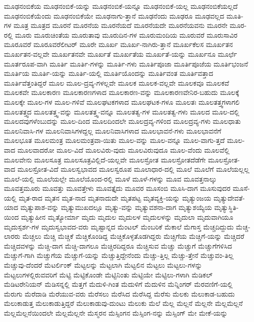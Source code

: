 {ಮೂಢನಂಬಿಕೆಯ
ಮೂಢನಂಬಿಕೆ-ಯನ್ನು
ಮೂಢನಂಬಿಕೆ-ಯನ್ನೂ
ಮೂಢನಂಬಿಕೆ-ಯಲ್ಲ
ಮೂಢನಂಬಿಕೆಯಲ್ಲದೆ
ಮೂಢನಂಬಿಕೆಯೆಂದು
ಮೂಢನಂಬಿಕೆಯೇ
ಮೂಢನಾಗು-ತ್ತಾನೆ
ಮೂಢನೆಂದು
ಮೂಢರೂ
ಮೂಢವಲ್ಲದ
ಮೂತಿ-ಗಳ
ಮೂತ್ರ
ಮೂತ್ರದ
ಮೂರನೆ
ಮೂರನೆಯ
ಮೂರನೆಯದೆ
ಮೂರನೆಯದೇ
ಮೂರನೆಯವನು
ಮೂರನೇ
ಮೂರ-ರಲ್ಲಿ
ಮೂರು
ಮೂರುಚಿಂತೆಯ
ಮೂರುತಾವು
ಮೂರುದಿನ-ಗಳ
ಮೂರುಮಂದಿಯ
ಮೂರುವರೆ
ಮೂರುಸಾವಿರ
ಮೂರೂವರೆ
ಮೂರೂವರೆಲೀಟರ್
ಮೂರೇ
ಮೂರ್ಖ
ಮೂರ್ಖ-ನಾಗಿರು-ತ್ತಾನೆ
ಮೂರ್ಖಕೆಲಸ
ಮೂರ್ಖತನ
ಮೂರ್ಖತನ-ವಲ್ಲವೇ
ಮೂರ್ಖತನವೇ
ಮೂರ್ಖತೆ
ಮೂರ್ಖತೆಯ
ಮೂರ್ಖತೆ-ಯನ್ನು
ಮೂರ್ಖನೂ
ಮೂರ್ಛೆ
ಮೂರ್ತರೂಪ-ವಾಗಿ
ಮೂರ್ತಿ
ಮೂರ್ತಿ-ಗಳನ್ನು
ಮೂರ್ತಿ-ಗಳು
ಮೂರ್ತಿಪೂಜಾ
ಮೂರ್ತಿಪೂಜೆಯ
ಮೂರ್ತಿಭಂಜನೆ
ಮೂರ್ತಿಯ
ಮೂರ್ತಿ-ಯನ್ನು
ಮೂರ್ತಿ-ಯಲ್ಲಿ
ಮೂರ್ತಿಯೊಂದನ್ನು
ಮೂರ್ತಿವಂತ
ಮೂರ್ತಿವತ್ತಾದ
ಮೂರ್ತಿವೆತ್ತಂತಿದ್ದರೆ
ಮೂಲ
ಮೂಲ-ದ್ರವ್ಯ-ಗಳಲ್ಲವೇ
ಮೂಲಕ
ಮೂಲಕ-ವಲ್ಲವೇ
ಮೂಲಕವೂ
ಮೂಲಕವೆ
ಮೂಲಕವೇ
ಮೂಲಕಾರಣ
ಮೂಲಕಾರಣಗಳಾದ
ಮೂಲಕಾರಣ-ವನ್ನು
ಮೂಲಕಾರಣವೇನಿರ-ಬಹುದು
ಮೂಲಕ್ಕೆ
ಮೂಲಕ್ಕೇ
ಮೂಲ-ಗಳ
ಮೂಲ-ಗಳಿವೆ
ಮೂಲಘಟಕಗಳಾದ
ಮೂಲಘಟಕ-ಗಳೂ
ಮೂಲತಃ
ಮೂಲತತ್ತ್ವಗಳಾಗಲಿ
ಮೂಲತತ್ತ್ವದ
ಮೂಲತತ್ತ್ವ-ವನ್ನು
ಮೂಲತತ್ತ್ವ-ವನ್ನೂ
ಮೂಲತತ್ವ-ಗಳ
ಮೂಲತತ್ವ-ಗಳು
ಮೂಲದ
ಮೂಲ-ದಲ್ಲಿ
ಮೂಲದವುಗಳೆಂಬುದನ್ನು
ಮೂಲ-ದಿಂದ
ಮೂಲದಿಂದಲೇ
ಮೂಲದ್ರವ್ಯ-ಗಳಿಂದ
ಮೂಲದ್ರವ್ಯ-ಗಳು
ಮೂಲಧಾತು
ಮೂಲನಿವಾಸಿ-ಗಳ
ಮೂಲನಿವಾಸಿಗಳದ್ದಲ್ಲ
ಮೂಲನಿವಾಸಿಗಳಾದ
ಮೂಲಭಾವನೆ-ಗಳು
ಮೂಲಭಾವನೆಗೆ
ಮೂಲಭೂತ
ಮೂಲಮಂತ್ರ
ಮೂಲಮಂತ್ರವಾ-ಯಿತು
ಮೂಲ-ವನ್ನು
ಮೂಲ-ವನ್ನೂ
ಮೂಲ-ವಾಗು-ತ್ತದೆ
ಮೂಲ-ವಾದ
ಮೂಲವಾದರೋ
ಮೂಲ-ವಿದೆ
ಮೂಲವಿರು-ವುದು
ಮೂಲವಿರುವುದೂ
ಮೂಲ-ವೆಂದು
ಮೂಲವೆಲ್ಲಿ
ಮೂಲವೇನು
ಮೂಲಸೂತ್ರ
ಮೂಲಸೂತ್ರವಿಲ್ಲಿದೆ-ಯಲ್ಲವೇ
ಮೂಲಸ್ರೋತ
ಮೂಲಸ್ರೋತದೆಡೆಗೇ
ಮೂಲಸ್ರೋತ-ವಾದ
ಮೂಲಸ್ರೋತ-ವಿದೆ
ಮೂಲಸ್ವಭಾವದ
ಮೂಲಸ್ವರೂಪ
ಮೂಲಾಧಾರ-ದಲ್ಲಿ
ಮೂಲೆ
ಮೂಲೆಗೆ
ಮೂಲೆಯಲ್ಲಲ್ಲ
ಮೂಲೆ-ಯಲ್ಲಿ
ಮೂಲೆಯಲ್ಲೇ
ಮೂಲೆಯೊಂದ-ರಲ್ಲಿ
ಮೂಳೆ
ಮೂಳೆ-ಗಳನ್ನು
ಮೂವ
ಮೂವತ್ತನಾಲ್ಕು
ಮೂವತ್ತಮೂರು
ಮೂವತ್ತು
ಮೂವತ್ತೇಳು
ಮೂವತ್ತೈದು
ಮೂವರ
ಮೂಸಂಬಿ
ಮೂಸಿ-ದಾಗ
ಮೂಸುವುದರ
ಮೂಸೆ-ಯಲ್ಲಿ
ಮೃತ-ರಾದ
ಮೃತನ
ಮೃತ-ನಾದ
ಮೃತನಾದುದೇ
ಮೃತಪಟ್ಟ
ಮೃತವ್ಯಕ್ತಿ-ಯನ್ನು
ಮೃತ್ಯುಂಜಯ
ಮೃತ್ಯುದೇವತೆ-ಯಾದ
ಮೃತ್ಯುಪಾಶ-ವನ್ನು
ಮೃತ್ಯುಮುಖದಲ್ಲೂ
ಮೃತ್ಯು-ವನ್ನು
ಮೃತ್ಯುವಶನಾ-ದಾಗ
ಮೃತ್ಯುಶಯ್ಯೆಯ
ಮೃತ್ಯುಸ್ಥಿತಿ-ಯಿಂದ
ಮೃತ್ಯುಹೀನ
ಮೃತ್ಯೋರ್ಮಾ
ಮೃದು
ಮೃದುಲ
ಮೃದುಲಳ
ಮೃದುಲಳನ್ನು
ಮೃದುಲಾ
ಮೃದುವಾಗಿಯೂ
ಮೃದುಸ್ಪರ್ಶ-ಗಳ
ಮೃದುಸ್ವಭಾವದ-ವರು
ಮೃಷ್ಟಾನ್ನದ
ಮೆಂಟಲ್
ಮೆಂಬರಿಕೆ
ಮೆಕಾಲೆ
ಮೆಗಾಸ್ತ
ಮೆಚ್ಚದಿದ್ದುದು
ಮೆಚ್ಚ-ಲಾರರು
ಮೆಚ್ಚಲು
ಮೆಚ್ಚಿ
ಮೆಚ್ಚಿಕೆ
ಮೆಚ್ಚಿಕೊಂಡಿದ್ದ
ಮೆಚ್ಚಿಕೊಳ್ಳತೊಡಗಿದ್ದರು
ಮೆಚ್ಚಿಗೆಯ
ಮೆಚ್ಚಿಗೆ-ಯನ್ನು
ಮೆಚ್ಚಿದರೆ
ಮೆಚ್ಚಿದವಳನ್ನು
ಮೆಚ್ಚಿ-ದಾಗ
ಮೆಚ್ಚಿ-ದಾಗಲೂ
ಮೆಚ್ಚಿರದಿದ್ದರೂ
ಮೆಚ್ಚಿಸುವ
ಮೆಚ್ಚು
ಮೆಚ್ಚುಗೆ
ಮೆಚ್ಚುಗೆಗಳಿಸಿದ
ಮೆಚ್ಚುಗೆ-ಗಾಗಿ
ಮೆಚ್ಚುಗೆಯ
ಮೆಚ್ಚುಗೆ-ಯನ್ನು
ಮೆಚ್ಚುತ್ತಿದ್ದೇನೆಂದು
ಮೆಚ್ಚು-ತ್ತಿಲ್ಲ
ಮೆಚ್ಚು-ತ್ತೇನೆ
ಮೆಚ್ಚುವಂ-ತಿಲ್ಲ
ಮೆಚ್ಚುವು-ದೆಂದರೆ
ಮೆಟರ್ಲಿಂಕ್
ಮೆಟ್ಟಲನ್ನು
ಮೆಟ್ಟಲಾಗಿ
ಮೆಟ್ಟಲಿನ
ಮೆಟ್ಟಲು
ಮೆಟ್ಟಲು-ಗಳನ್ನು
ಮೆಟ್ಟಲುಗಳಲ್ಲಿರುವವರಿಗೆ
ಮೆಟ್ಟಿ
ಮೆಟ್ಟಿಕೊಂಡೇ
ಮೆಟ್ಟಿನಿಂತು
ಮೆಟ್ಟಿಯೇ
ಮೆಟ್ಟಿಲು-ಗಳಾಗಿ
ಮೆಡಿಕಲ್
ಮೆಡಿಟರೇನಿಯನ್
ಮೆಡಿಸನ್ನಲ್ಲಿ
ಮೆತ್ತಗೆ
ಮೆದುಳಿ-ಗಿಂತ
ಮೆದುಳಿಗೆ
ಮೆದುಳಿನ
ಮೆನ್ನಿಂಗರ್
ಮೆರವಣಿಗೆ-ಯಲ್ಲಿ
ಮೆರುಗು
ಮೆರೆದಾಡಿ
ಮೆರೆಯುವ-ವರು
ಮೆರೆಸಲು
ಮೆರೆಸಿದ
ಮೆರೆಸಿದ್ದ
ಮೆರೆಸು
ಮೆಲಕು
ಮೆಲುಕಾಡ-ಬಹುದು
ಮೆಲುಕಾಡುತ್ತ
ಮೆಲುಕಾಡುತ್ತಿದ್ದರೆ
ಮೆಲುಕಾಡುವು-ದುಂಟು
ಮೆಲುಕು
ಮೆಲೆ
ಮೆಲ್ಲ
ಮೆಲ್ಲನೆ
ಮೆಲ್ಲನೇ
ಮೆಲ್ಲಮೆಲ್ಲನೆ
ಮೆಲ್ಲಮೆಲ್ಲನೆಯಿಂದಲೇ
ಮೆಲ್ಲಮೆಲ್ಲನೇ
ಮೆಸ್ಮರನ
ಮೆಸ್ಸಿಂಗನ
ಮೆಸ್ಸಿಂಗ-ನನ್ನು
ಮೆಸ್ಸಿಂಗ್
ಮೇ
ಮೇಕೆ-ಯನ್ನು
}

